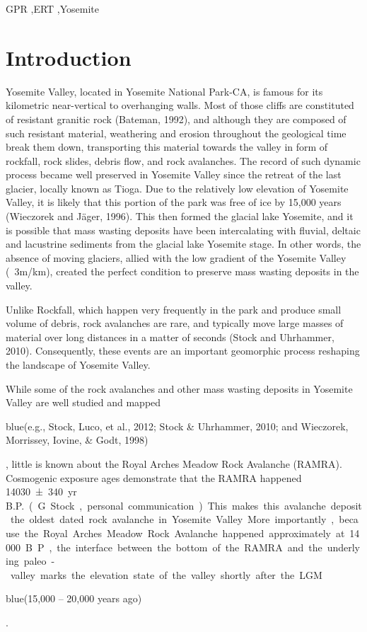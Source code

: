 \documentclass[5p]{elsarticle}
\newcommand{\COMON}{\begin{color}{blue}}
\newcommand{\COMOFF}{\end{color}}
\begin{document}
\begin{frontmatter}
\begin{abstract}
									\end{abstract}

					\begin{keyword}
GPR \sep ERT \sep Yosemite
					\end{keyword}

	\end{frontmatter}


									\section{Introduction}

Yosemite Valley, located in Yosemite National Park-CA, is famous for its kilometric near-vertical to overhanging walls. Most of those cliffs are constituted of resistant granitic rock (Bateman, 1992), and although they are composed of such resistant material, weathering and erosion throughout the geological time break them down, transporting this material towards the valley in form of rockfall, rock slides, debris flow, and rock avalanches. The record of such dynamic process became well preserved in Yosemite Valley since the retreat of the last glacier, locally known as Tioga. Due to the relatively low elevation of Yosemite Valley, it is likely that this portion of the park was free of ice by 15,000 years (Wieczorek and Jäger, 1996). This then formed the glacial lake Yosemite, and it is possible that mass wasting deposits have been intercalating with fluvial, deltaic and lacustrine sediments from the glacial lake Yosemite stage.   In other words, the absence of moving glaciers, allied with the low gradient of the Yosemite Valley (~3m/km), created the perfect condition to preserve mass wasting deposits in the valley. 

Unlike Rockfall, which happen very frequently in the park and produce small volume of debris, rock avalanches are rare, and typically move large masses of material over long distances in a matter of seconds (Stock and Uhrhammer, 2010). Consequently, these events are an important geomorphic process reshaping the landscape of Yosemite Valley. 

While some of the rock avalanches and other mass wasting deposits in Yosemite Valley are well studied and mapped \COMON(e.g., Stock, Luco, et al., 2012;  Stock \& Uhrhammer, 2010; and Wieczorek, Morrissey, Iovine, \& Godt, 1998) \COMOFF, little is known about the Royal Arches Meadow Rock Avalanche (RAMRA). Cosmogenic  exposure ages demonstrate that the RAMRA happened \SI{14030 \pm 340}{yr\, B.P.} (G. Stock, personal communication). This makes this avalanche deposit the oldest dated rock avalanche in Yosemite Valley. More importantly, because the Royal Arches Meadow Rock Avalanche happened approximately at 14000 B.P., the interface between the bottom of the RAMRA and the underlying paleo-valley marks the elevation state of the valley shortly after the LGM \COMON(15,000 – 20,000 years ago)\COMOFF. 
\end{document}

